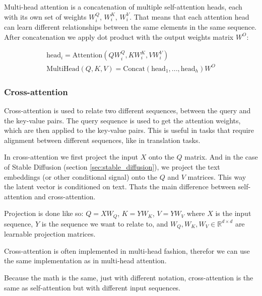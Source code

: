 Multi-head attention is a concatenation of multiple self-attention heads, each with its own set of weights $W_i^Q$, $W_i^K$, $W_i^V$. That means that each attention head can learn different relationships between the same elements in the same sequence. After concatenation we apply dot product with the output weights matrix $W^O$:

\begin{equation}
    \begin{aligned}
        \text{head}_i = \text{Attention}(QW_i^Q, KW_i^K, VW_i^V)  \\
        \text{MultiHead}(Q, K, V) = \text{Concat}(\text{head}_1, ..., \text{head}_h)W^O
    \end{aligned}
\end{equation}









\subsubsection{Cross-attention}

Cross-attention is used to relate two different sequences, between the query and the key-value pairs. The query sequence is used to get the attention weights, which are then applied to the key-value pairs. This is useful in tasks that require alignment between different sequences, like in translation tasks.

In cross-attention we first project the input $X$ onto the $Q$ matrix. And in the case of Stable Diffusion (section \ref{sec:stable_diffusion}), we project the text embeddings (or other conditional signal) onto the $Q$ and $V$ matrices. This way the latent vector is conditioned on text. Thats the main difference between self-attention and cross-attention.

Projection is done like so: $Q = XW_Q$, $K = YW_K$, $V = YW_V$ where $X$ is the input sequence, $Y$ is the sequence we want to relate to, and $W_Q, W_K, W_V \in \mathbb{R}^{d \times d}$ are learnable projection matrices.

Cross-attention is often implemented in multi-head fashion, therefor we can use the same implementation as in multi-head attention.

Because the math is the same, just with different notation, cross-attention is the same as self-attention but with different input sequences.







